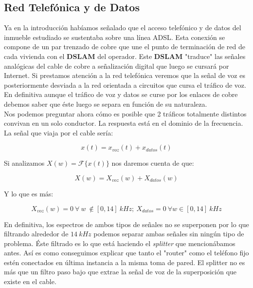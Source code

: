 \documentclass{article}[12 pt]
\begin{document}
		\subsection{Red Telefónica y de Datos}
			Ya en la introducción habíamos señalado que el acceso telefónico y de datos del inmueble estudiado se sustentaba sobre una línea ADSL. Esta conexión se compone de un par trenzado de cobre que une el punto de terminación de red de cada vivienda con el \textbf{DSLAM} del operador. Este \textbf{DSLAM} "traduce" las señales analógicas del cable de cobre a señalización digital que luego se cursará por Internet. Si prestamos atención a la red telefónica veremos que la señal de voz es posteriormente desviada a la red orientada a circuitos que cursa el tráfico de voz. En definitiva aunque el tráfico de voz y datos se curse por los enlaces de cobre debemos saber que éste luego se separa en función de su naturaleza.\\

			Nos podemos preguntar ahora cómo es posible que 2 tráficos totalmente distintos convivan en un solo conductor. La respuesta está en el dominio de la frecuencia. La señal que viaja por el cable sería:

			$$x(t) = x_{voz}(t) + x_{datos}(t)$$

			Si analizamos $X(w) = \mathcal{F}\{x(t)\}$ nos daremos cuenta de que:

			$$X(w) = X_{voz}(w) + X_{datos}(w)$$

			Y lo que es más:

			$$X_{voz}(w) = 0\ \forall \ w \ \notin [0, 14]\ kHz;\ X_{datos} = 0\ \forall w \in [0, 14]\ kHz$$

			En definitiva, los espectros de ambos tipos de señales no se superponen por lo que filtrando alrededor de $14\ kHz$ podemos separar ambas señales sin ningún tipo de problema. Éste filtrado es lo que está haciendo el \textit{splitter} que mencionábamos antes. Así es como conseguimos explicar que tanto el "router" como el teléfono fijo estén conectados en última instancia a la misma toma de pared. El splitter no es más que un filtro paso bajo que extrae la señal de voz de la superposición que existe en el cable.\\
\end{document}
